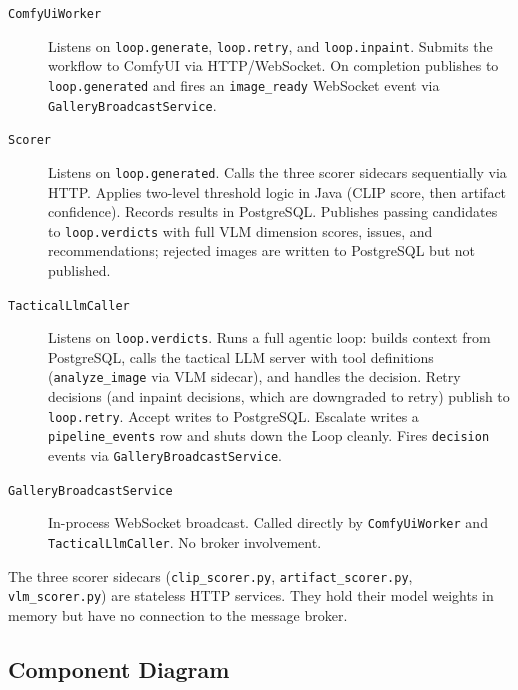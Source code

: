 \documentclass[11pt,letterpaper]{article}
\begin{document}
\begin{description}
  \item[\texttt{ComfyUiWorker}] Listens on \texttt{loop.generate},
        \texttt{loop.retry}, and \texttt{loop.inpaint}. Submits the workflow
        to ComfyUI via HTTP/WebSocket. On completion publishes to
        \texttt{loop.generated} and fires an \texttt{image\_ready} WebSocket
        event via \texttt{GalleryBroadcastService}.
  \item[\texttt{Scorer}] Listens on \texttt{loop.generated}. Calls the three
        scorer sidecars sequentially via HTTP. Applies two-level threshold logic
        in Java (CLIP score, then artifact confidence). Records results in
        PostgreSQL. Publishes passing candidates to \texttt{loop.verdicts} with
        full VLM dimension scores, issues, and recommendations; rejected images
        are written to PostgreSQL but not published.
  \item[\texttt{TacticalLlmCaller}] Listens on \texttt{loop.verdicts}. Runs
        a full agentic loop: builds context from PostgreSQL, calls the tactical
        LLM server with tool definitions (\texttt{analyze\_image} via VLM
        sidecar), and handles the decision. Retry decisions (and inpaint decisions,
        which are downgraded to retry) publish to \texttt{loop.retry}. Accept writes
        to PostgreSQL. Escalate writes a \texttt{pipeline\_events} row and
        shuts down the Loop cleanly. Fires \texttt{decision} events via
        \texttt{GalleryBroadcastService}.
  \item[\texttt{GalleryBroadcastService}] In-process WebSocket broadcast.
        Called directly by \texttt{ComfyUiWorker} and
        \texttt{TacticalLlmCaller}. No broker involvement.
\end{description}

The three scorer sidecars (\texttt{clip\_scorer.py},
\texttt{artifact\_scorer.py}, \texttt{vlm\_scorer.py}) are stateless HTTP
services. They hold their model weights in memory but have no connection to
the message broker.

\subsection{Component Diagram}
\end{document}
